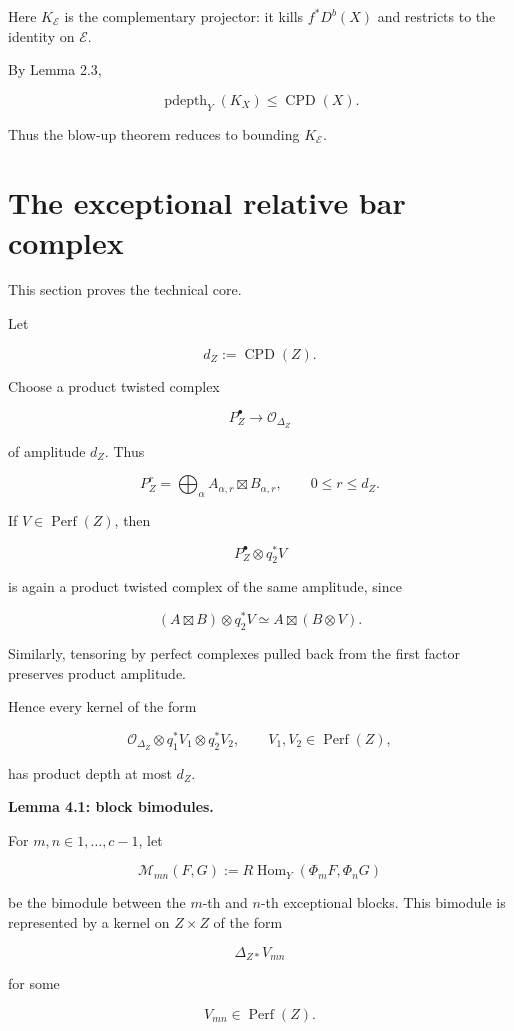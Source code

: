 \documentclass[11pt]{amsart}
\theoremstyle{definition}
\begin{document}
Here $K_{\mathcal E}$ is the complementary projector: it kills $f^*D^b(X)$ and restricts to the identity on $\mathcal E$.

By Lemma 2.3,

\[
\operatorname{pdepth}_Y(K_X)\le \operatorname{CPD}(X).
\tag{3.4}
\]

Thus the blow-up theorem reduces to bounding $K_{\mathcal E}$.

\section{The exceptional relative bar complex}

This section proves the technical core.

Let

\[
d_Z:=\operatorname{CPD}(Z).
\]

Choose a product twisted complex

\[
P_Z^\bullet\to\mathcal O_{\Delta_Z}
\]

of amplitude $d_Z$. Thus

\[
P_Z^r=
\bigoplus_\alpha A_{\alpha,r}\boxtimes B_{\alpha,r},
\qquad
0\le r\le d_Z.
\]

If $V\in\operatorname{Perf}(Z)$, then

\[
P_Z^\bullet\otimes q_2^*V
\]

is again a product twisted complex of the same amplitude, since

\[
(A\boxtimes B)\otimes q_2^*V
\simeq
A\boxtimes(B\otimes V).
\]

Similarly, tensoring by perfect complexes pulled back from the first factor preserves product amplitude.

Hence every kernel of the form

\[
\mathcal O_{\Delta_Z}\otimes q_1^*V_1\otimes q_2^*V_2,
\qquad
V_1,V_2\in \operatorname{Perf}(Z),
\]

has product depth at most $d_Z$.

\noindent\textbf{Lemma 4.1: block bimodules.}

For $m,n\in{1,\dots,c-1}$, let

\[
\mathcal M_{mn}(F,G)
:=
R\operatorname{Hom}_Y(\Phi_mF,\Phi_nG)
\]

be the bimodule between the $m$-th and $n$-th exceptional blocks. This bimodule is represented by a kernel on $Z\times Z$ of the form

\[
\Delta_{Z*}V_{mn}
\]

for some

\[
V_{mn}\in\operatorname{Perf}(Z).
\]
\end{document}
